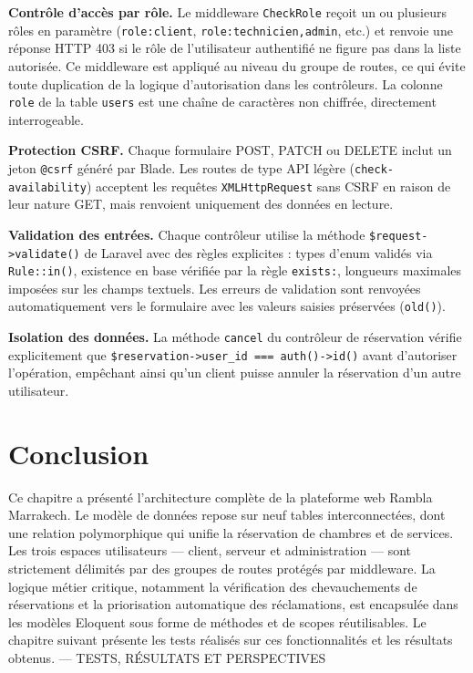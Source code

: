 \documentclass[12pt,a4paper]{report}
\begin{document}
\textbf{Contrôle d'accès par rôle.} Le middleware \texttt{CheckRole}
reçoit un ou plusieurs rôles en paramètre (\texttt{role:client},
\texttt{role:technicien,admin}, etc.) et renvoie une réponse HTTP 403 si
le rôle de l'utilisateur authentifié ne figure pas dans la liste autorisée.
Ce middleware est appliqué au niveau du groupe de routes, ce qui évite toute
duplication de la logique d'autorisation dans les contrôleurs. La colonne
\texttt{role} de la table \texttt{users} est une chaîne de caractères non
chiffrée, directement interrogeable.

\textbf{Protection CSRF.} Chaque formulaire POST, PATCH ou DELETE inclut
un jeton \texttt{@csrf} généré par Blade. Les routes de type API légère
(\texttt{check-availability}) acceptent les requêtes \texttt{XMLHttpRequest}
sans CSRF en raison de leur nature GET, mais renvoient uniquement des
données en lecture.

\textbf{Validation des entrées.} Chaque contrôleur utilise la méthode
\texttt{\$request->validate()} de Laravel avec des règles explicites :
types d'enum validés via \texttt{Rule::in()}, existence en base vérifiée
par la règle \texttt{exists:}, longueurs maximales imposées sur les champs
textuels. Les erreurs de validation sont renvoyées automatiquement vers le
formulaire avec les valeurs saisies préservées (\texttt{old()}).

\textbf{Isolation des données.} La méthode \texttt{cancel} du contrôleur
de réservation vérifie explicitement que \texttt{\$reservation->user\_id ===
auth()->id()} avant d'autoriser l'opération, empêchant ainsi qu'un client
puisse annuler la réservation d'un autre utilisateur.

\section{Conclusion}

Ce chapitre a présenté l'architecture complète de la plateforme web Rambla
Marrakech. Le modèle de données repose sur neuf tables interconnectées,
dont une relation polymorphique qui unifie la réservation de chambres et
de services. Les trois espaces utilisateurs --- client, serveur et
administration --- sont strictement délimités par des groupes de routes
protégés par middleware. La logique métier critique, notamment la
vérification des chevauchements de réservations et la priorisation
automatique des réclamations, est encapsulée dans les modèles Eloquent
sous forme de méthodes et de scopes réutilisables. Le chapitre suivant
présente les tests réalisés sur ces fonctionnalités et les résultats
obtenus. — TESTS, RÉSULTATS ET PERSPECTIVES
\end{document}
